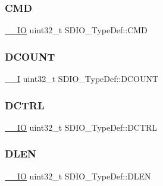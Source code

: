 \mbox{\label{struct_s_d_i_o___type_def_abbbdc3174e12dab21123d746d65f345d}} 
\subsubsection{\texorpdfstring{CMD}{CMD}}
{\footnotesize\ttfamily \mbox{\hyperlink{group___c_m_s_i_s___c_m3__core__definitions_gaec43007d9998a0a0e01faede4133d6be}{\+\_\+\+\_\+\+IO}} uint32\+\_\+t S\+D\+I\+O\+\_\+\+Type\+Def\+::\+C\+MD}

\mbox{\label{struct_s_d_i_o___type_def_a0366564e2795952d520c0de4be70020f}} 
\subsubsection{\texorpdfstring{DCOUNT}{DCOUNT}}
{\footnotesize\ttfamily \mbox{\hyperlink{group___c_m_s_i_s___c_m3__core__definitions_gaf63697ed9952cc71e1225efe205f6cd3}{\+\_\+\+\_\+I}} uint32\+\_\+t S\+D\+I\+O\+\_\+\+Type\+Def\+::\+D\+C\+O\+U\+NT}

\mbox{\label{struct_s_d_i_o___type_def_a801519a7af801ad43b88007bf4e2e906}} 
\subsubsection{\texorpdfstring{DCTRL}{DCTRL}}
{\footnotesize\ttfamily \mbox{\hyperlink{group___c_m_s_i_s___c_m3__core__definitions_gaec43007d9998a0a0e01faede4133d6be}{\+\_\+\+\_\+\+IO}} uint32\+\_\+t S\+D\+I\+O\+\_\+\+Type\+Def\+::\+D\+C\+T\+RL}

\mbox{\label{struct_s_d_i_o___type_def_aa98ab507ed05468ca4baccd1731231cd}} 
\subsubsection{\texorpdfstring{DLEN}{DLEN}}
{\footnotesize\ttfamily \mbox{\hyperlink{group___c_m_s_i_s___c_m3__core__definitions_gaec43007d9998a0a0e01faede4133d6be}{\+\_\+\+\_\+\+IO}} uint32\+\_\+t S\+D\+I\+O\+\_\+\+Type\+Def\+::\+D\+L\+EN}

